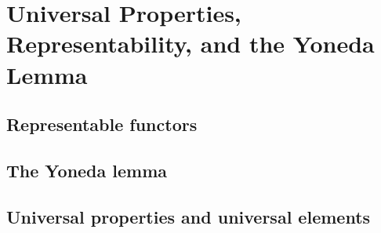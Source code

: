 \documentclass[main.tex]{subfiles}
\begin{document}
\chapter{Universal Properties, Representability, and the Yoneda Lemma}
\section{Representable functors}






\pagebreak
\section{The Yoneda lemma}







\pagebreak
\section{Universal properties and universal elements}


% 










\end{document}
